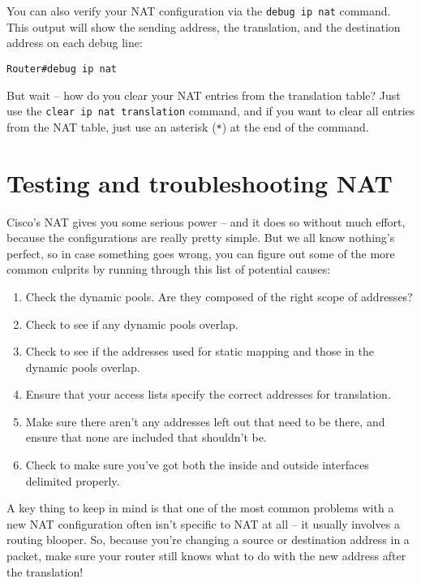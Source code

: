 You can also verify your NAT configuration via the
\texttt{debug\ ip\ nat} command. This output will show the sending
address, the translation, and the destination address on each debug
line:

\begin{verbatim}
Router#debug ip nat
\end{verbatim}

But wait -- how do you clear your NAT entries from the translation table?
Just use the \texttt{clear\ ip\ nat\ translation} command, and if you
want to clear all entries from the NAT table, just use an asterisk
(\texttt{*}) at the end of the command.



\section{Testing and troubleshooting NAT}

Cisco's NAT gives you some serious power -- and it does so without much
effort, because the configurations are really pretty simple. But we all
know nothing's perfect, so in case something goes wrong, you can figure
out some of the more common culprits by running through this list of
potential causes:

\begin{enumerate}
\tightlist
\item
  Check the dynamic pools. Are they composed of the right scope of
  addresses?
\item
  Check to see if any dynamic pools overlap.
\item
  Check to see if the addresses used for static mapping and those in the
  dynamic pools overlap.
\item
  Ensure that your
  access lists specify the correct addresses for translation.
\item
  Make sure there aren't any addresses left out that need to be there,
  and ensure that none are included that shouldn't be.
\item
  Check to make sure you've got both the inside and outside interfaces
  delimited properly.
\end{enumerate}

A key thing to keep in mind is that one of the most common problems with
a new NAT configuration often isn't specific to NAT at all -- it usually
involves a routing blooper. So, because you're changing a source or
destination address in a packet, make sure your router still knows what
to do with the new address after the translation!

